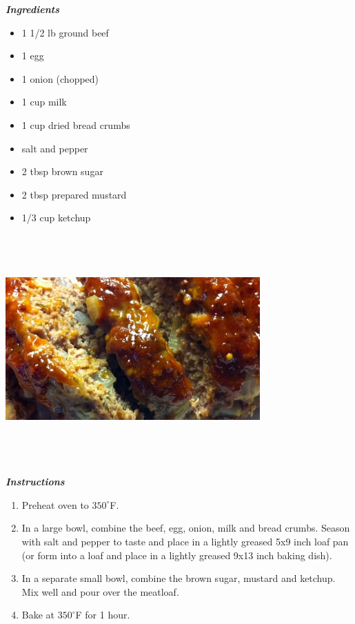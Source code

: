 \documentclass[openany]{book}
\newcommand{\ingredients}[1][\textbf{\Large\emph{Ingredients}}]{%
    \begin{center} \emph{#1} \end{center}}
\newcommand{\instructions}[1][
    \textbf{\Large\emph{Instructions}}]{%
    \begin{center}
    \emph{#1}
    \end{center}}%
\newcommand{\temp}[1]{%
    $#1^\circ$F}
\begin{document}
\begin{multicols}{2}
\ingredients
\begin{itemize}
    \item 1 1/2 lb ground beef
    \item 1 egg
    \item 1 onion (chopped)
    \item 1 cup milk
    \item 1 cup dried bread crumbs
    \item salt and pepper 
    \item 2 tbsp brown sugar
    \item 2 tbsp prepared mustard
    \item 1/3 cup ketchup
\end{itemize}

\vfill\null
\columnbreak

\hspace{-2cm}
\includegraphics[height=8.75cm, width=9.75cm]{Pictures/Meatloaf.jpg}
\end{multicols}

\instructions
\begin{enumerate}
    \item Preheat oven to \temp{350}.
    \item In a large bowl, combine the beef, egg, onion, milk and bread crumbs. Season with salt and pepper to taste and place in a lightly greased 5x9 inch loaf pan (or form into a loaf and place in a lightly greased 9x13 inch baking dish).
    \item In a separate small bowl, combine the brown sugar, mustard and ketchup. Mix well and pour over the meatloaf.
    \item Bake at \temp{350} for 1 hour.
\end{enumerate}
\end{document}
